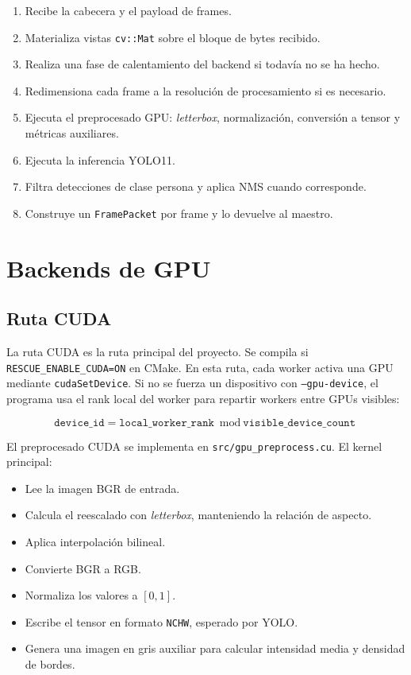 \documentclass[12pt,a4paper]{article}
\begin{document}
\begin{enumerate}
    \item Recibe la cabecera y el payload de frames.
    \item Materializa vistas \texttt{cv::Mat} sobre el bloque de bytes recibido.
    \item Realiza una fase de calentamiento del backend si todav\'ia no se ha hecho.
    \item Redimensiona cada frame a la resoluci\'on de procesamiento si es necesario.
    \item Ejecuta el preprocesado GPU: \textit{letterbox}, normalizaci\'on, conversi\'on a tensor y m\'etricas auxiliares.
    \item Ejecuta la inferencia YOLO11.
    \item Filtra detecciones de clase persona y aplica NMS cuando corresponde.
    \item Construye un \texttt{FramePacket} por frame y lo devuelve al maestro.
\end{enumerate}

\section{Backends de GPU}

\subsection{Ruta CUDA}

La ruta CUDA es la ruta principal del proyecto. Se compila si \texttt{RESCUE\_ENABLE\_CUDA=ON}
en CMake. En esta ruta, cada worker activa una GPU mediante \texttt{cudaSetDevice}. Si no se
fuerza un dispositivo con \texttt{--gpu-device}, el programa usa el rank local del worker para
repartir workers entre GPUs visibles:

\[
    \texttt{device\_id} =
    \texttt{local\_worker\_rank} \bmod \texttt{visible\_device\_count}
\]

El preprocesado CUDA se implementa en \texttt{src/gpu\_preprocess.cu}. El kernel principal:

\begin{itemize}
    \item Lee la imagen BGR de entrada.
    \item Calcula el reescalado con \textit{letterbox}, manteniendo la relaci\'on de aspecto.
    \item Aplica interpolaci\'on bilineal.
    \item Convierte BGR a RGB.
    \item Normaliza los valores a $[0,1]$.
    \item Escribe el tensor en formato \texttt{NCHW}, esperado por YOLO.
    \item Genera una imagen en gris auxiliar para calcular intensidad media y densidad de bordes.
\end{itemize}
\end{document}
